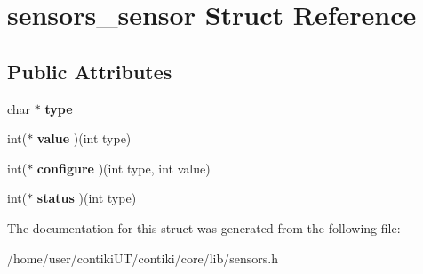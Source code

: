 \hypertarget{structsensors__sensor}{}\section{sensors\+\_\+sensor Struct Reference}
\label{structsensors__sensor}
\subsection*{Public Attributes}
\begin{DoxyCompactItemize}
\item 
\hypertarget{structsensors__sensor_aa937a3076947e000b5b8a5b65c6ff2b0}{}char $\ast$ {\bfseries type}\label{structsensors__sensor_aa937a3076947e000b5b8a5b65c6ff2b0}

\item 
\hypertarget{structsensors__sensor_a00b93025ac5212fd854bc37fc1fee8df}{}int($\ast$ {\bfseries value} )(int type)\label{structsensors__sensor_a00b93025ac5212fd854bc37fc1fee8df}

\item 
\hypertarget{structsensors__sensor_a510316ea2337bdb873c21d77ff6b3bb9}{}int($\ast$ {\bfseries configure} )(int type, int value)\label{structsensors__sensor_a510316ea2337bdb873c21d77ff6b3bb9}

\item 
\hypertarget{structsensors__sensor_a2d5842d705baf27ecb8fc91cf78bacdd}{}int($\ast$ {\bfseries status} )(int type)\label{structsensors__sensor_a2d5842d705baf27ecb8fc91cf78bacdd}

\end{DoxyCompactItemize}


The documentation for this struct was generated from the following file\+:\begin{DoxyCompactItemize}
\item 
/home/user/contiki\+U\+T/contiki/core/lib/sensors.\+h\end{DoxyCompactItemize}

